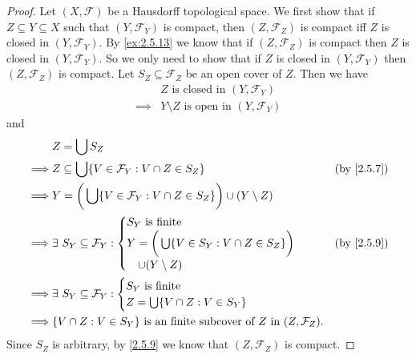 \begin{proof}
  Let \((X, \mathcal{F})\) be a Hausdorff topological space.
  We first show that if \(Z \subseteq Y \subseteq X\) such that \((Y, \mathcal{F}_Y)\) is compact, then \((Z, \mathcal{F}_Z)\) is compact iff \(Z\) is closed in \((Y, \mathcal{F}_Y)\).
  By \cref{ex:2.5.13} we know that if \((Z, \mathcal{F}_Z)\) is compact then \(Z\) is closed in \((Y, \mathcal{F}_Y)\).
  So we only need to show that if \(Z\) is closed in \((Y, \mathcal{F}_Y)\) then \((Z, \mathcal{F}_Z)\) is compact.
  Let \(S_Z \subseteq \mathcal{F}_Z\) be an open cover of \(Z\).
  Then we have
  \begin{align*}
             & Z \text{ is closed in } (Y, \mathcal{F}_Y)           \\
    \implies & Y \setminus Z \text{ is open in } (Y, \mathcal{F}_Y)
  \end{align*}
  and
  \begin{align*}
             & Z = \bigcup S_Z                                                                                                         \\
    \implies & Z \subseteq \bigcup \{V \in \mathcal{F}_Y : V \cap Z \in S_Z\}                               & \text{(by \cref{2.5.7})} \\
    \implies & Y = \bigg(\bigcup \{V \in \mathcal{F}_Y : V \cap Z \in S_Z\}\bigg) \cup (Y \setminus Z)                                 \\
    \implies & \exists\ S_Y \subseteq \mathcal{F}_Y : \begin{cases}
                                                        S_Y \text{ is finite}                                    \\
                                                        Y = \bigg(\bigcup \{V \in S_Y : V \cap Z \in S_Z\}\bigg) \\
                                                        \quad \cup (Y \setminus Z)
                                                      \end{cases}                                  & \text{(by \cref{2.5.9})}          \\
    \implies & \exists\ S_Y \subseteq \mathcal{F}_Y : \begin{cases}
                                                        S_Y \text{ is finite} \\
                                                        Z = \bigcup \{V \cap Z : V \in S_Y\}
                                                      \end{cases}                                              \\
    \implies & \{V \cap Z : V \in S_Y\} \text{ is an finite subcover of } Z \text{ in } (Z, \mathcal{F}_Z).
  \end{align*}
  Since \(S_Z\) is arbitrary, by \cref{2.5.9} we know that \((Z, \mathcal{F}_Z)\) is compact.


\end{proof}
